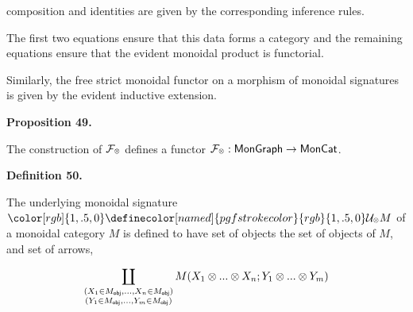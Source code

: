 \documentclass[10pt,a4paper]{article}
\begin{document}
composition and identities are given by the corresponding inference rules.\par
 
 
  
The first two equations ensure that this data forms a category and the remaining equations ensure that the evident monoidal product is functorial.\par
 
 
 
Similarly, the free strict monoidal functor on a morphism of monoidal signatures is given by the evident inductive extension.\par
 
 
 
 
\par\medskip\noindent\textbf{Proposition 49.}\par
 
 
The construction of $\mathcal{F}_{\mathbin{\raisebox{1.25pt}{$\scriptscriptstyle\otimes$}}}$ defines a functor $\mathcal{F}_{\mathbin{\raisebox{1.25pt}{$\scriptscriptstyle\otimes$}}}:\mathsf{MonGraph}\to\mathsf{MonCat}$.\par
 
 
 
 
\par\medskip\noindent\textbf{Definition 50.}\par
 
 
The underlying monoidal signature ${\color[rgb]{1,.5,0}\definecolor[named]{pgfstrokecolor}{rgb}{1,.5,0}\mathcal{U}_{\mathbin{\raisebox{1.25pt}{$\scriptscriptstyle\otimes$}}}}M$ of a monoidal category $M$ is defined to have set of objects the set of objects of $M$, and set of arrows,\par
    \[\coprod_{\begin{subarray}{c}(X_{1}\in M_{\mathsf{obj}},...,X_{n}\in M_{\mathsf{obj}})\\
(Y_{1}\in M_{\mathsf{obj}},...,Y_{m}\in M_{\mathsf{obj}})\end{subarray}}M(X_{1}\otimes...\otimes X_{n};Y_{1}\otimes...\otimes Y_{m})\]    
 
\end{document}
